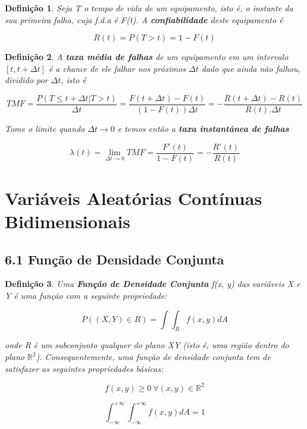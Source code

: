 \documentclass[12pt]{article}
\newtheorem{definition}{Definição}
\begin{document}
\begin{definition}
    Seja T o tempo de vida de um equipamento, isto é, o instante da sua primeira falha, cuja f.d.a é F(t). A \textbf{confiabilidade} deste equipamento é
    
    $$R(t) = P(T > t) = 1 - F(t)$$
\end{definition}

\begin{definition}
    A \textbf{taxa média de falhas} de um equipamento em um intervalo $[t, t + \Delta t]$ é a chance de ele falhar nos próximos $\Delta t$ dado que ainda não falhou, dividido por $\Delta t$, isto é
    
    $$TMF = \dfrac{P(T \leq t + \Delta t | T > t)}{\Delta t} = \dfrac{F(t + \Delta t) - F(t)}{(1 - F(t)) \Delta t} = - \dfrac{R(t + \Delta t) - R(t)}{R(t).\Delta t}$$
    
    Tome o limite quando $\Delta t \rightarrow{} 0$ e temos então a \textbf{taxa instantânea de falhas}
    
    $$\lambda(t) = \lim_{\Delta t \rightarrow{} 0} TMF = \dfrac{F'(t)}{1 - F(t)} = - \dfrac{R'(t)}{R(t)}$$
\end{definition}

\section{Variáveis Aleatórias Contínuas Bidimensionais}

\subsection*{6.1 Função de Densidade Conjunta}

\begin{definition}
    Uma \textbf{Função de Densidade Conjunta} f(x, y) das variáveis X e Y é uma função com a seguinte propriedade:
    
    $$P((X, Y) \in R) = \int \int_R f(x, y) d A$$
    
    onde R é um subconjunto qualquer do plano XY (isto é, uma região dentro do plano $\mathbb{R}^2$). Consequentemente, uma função de densidade conjunta tem de satisfazer as seguintes propriedades básicas:
    
    $$f(x, y) \geq 0 \ \forall (x, y) \in \mathbb{R}^2$$
    
    $$\int_{- \infty}^{+ \infty} \int_{- \infty}^{+ \infty} f(x, y) d A = 1$$
\end{definition}
\end{document}
